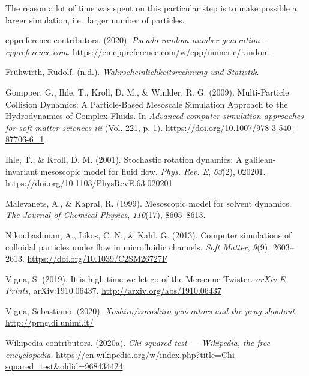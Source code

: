 \documentclass[
]{article}
\newlength{\cslhangindent}
\newenvironment{cslreferences}%
  {\setlength{\parindent}{0pt}%
  \everypar{\setlength{\hangindent}{\cslhangindent}}\ignorespaces}%
  {\par}
\begin{document}
The reason a lot of time was spent on this particular step is to make
possible a larger simulation, i.e.~larger number of particles.

\hypertarget{refs}{}
\begin{cslreferences}
\leavevmode\hypertarget{ref-cppreference:prng}{}%
cppreference contributors. (2020). \emph{Pseudo-random number generation
- cppreference.com}.
\url{https://en.cppreference.com/w/cpp/numeric/random}

\leavevmode\hypertarget{ref-fruehwirthstat}{}%
Frühwirth, Rudolf. (n.d.). \emph{Wahrscheinlichkeitsrechnung und
Statistik}.

\leavevmode\hypertarget{ref-winkl2009}{}%
Gompper, G., Ihle, T., Kroll, D. M., \& Winkler, R. G. (2009).
Multi-Particle Collision Dynamics: A Particle-Based Mesoscale Simulation
Approach to the Hydrodynamics of Complex Fluids. In \emph{Advanced
computer simulation approaches for soft matter sciences iii} (Vol. 221,
p. 1). \url{https://doi.org/10.1007/978-3-540-87706-6_1}

\leavevmode\hypertarget{ref-ihlekroll2001}{}%
Ihle, T., \& Kroll, D. M. (2001). Stochastic rotation dynamics: A
galilean-invariant mesoscopic model for fluid flow. \emph{Phys. Rev. E},
\emph{63}(2), 020201. \url{https://doi.org/10.1103/PhysRevE.63.020201}

\leavevmode\hypertarget{ref-malev1999}{}%
Malevanets, A., \& Kapral, R. (1999). Mesoscopic model for solvent
dynamics. \emph{The Journal of Chemical Physics}, \emph{110}(17),
8605--8613.

\leavevmode\hypertarget{ref-nikoubashman2013}{}%
Nikoubashman, A., Likos, C. N., \& Kahl, G. (2013). Computer simulations
of colloidal particles under flow in microfluidic channels. \emph{Soft
Matter}, \emph{9}(9), 2603--2613.
\url{https://doi.org/10.1039/C2SM26727F}

\leavevmode\hypertarget{ref-vigna2019}{}%
Vigna, S. (2019). It is high time we let go of the Mersenne Twister.
\emph{arXiv E-Prints}, arXiv:1910.06437.
\url{http://arxiv.org/abs/1910.06437}

\leavevmode\hypertarget{ref-unimi:xoshiro}{}%
Vigna, Sebastiano. (2020). \emph{Xoshiro/xoroshiro generators and the
prng shootout}. \url{http://prng.di.unimi.it/}

\leavevmode\hypertarget{ref-wiki:chisquaredtest}{}%
Wikipedia contributors. (2020a). \emph{Chi-squared test --- Wikipedia,
the free encyclopedia}.
\url{https://en.wikipedia.org/w/index.php?title=Chi-squared_test\&oldid=968434424}.


\end{cslreferences}
\end{document}
